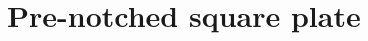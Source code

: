 \documentclass{beamer}
\begin{document}
\begin{frame}
\begin{center}
{    }%
  \end{center}
\end{frame}

\section{Pre-notched square plate}
\end{document}
